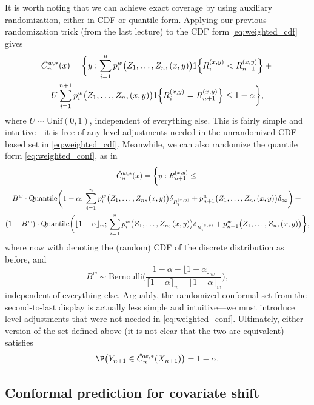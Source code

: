 \documentclass{article}
\begin{document}
It is worth noting that we can achieve exact coverage by using auxiliary
randomization, either in CDF or quantile form. Applying our previous
randomization trick (from the last lecture) to the CDF form
\eqref{eq:weighted_cdf} gives  
\begin{multline*}
\hat{C}_n^{w,*}(x) = \bigg\{ y : \sum_{i=1}^n p^w_i\big( Z_1,\dots,Z_n,(x,y)
\big) 1\Big\{ R_i^{(x,y)} < R^{(x,y)}_{n+1} \Big\} +{} \\ U \sum_{i=1}^{n+1} 
p^w_i\big( Z_1,\dots,Z_n,(x,y) \big) 1\Big\{ R_i^{(x,y)} = R^{(x,y)}_{n+1}
\Big\} \leq 1-\alpha \bigg\},
\end{multline*}
where $U \sim \mathrm{Unif}(0,1)$, independent of everything else. This is
fairly simple and intuitive---it is free of any level adjustments needed in the   
unrandomized CDF-based set in \eqref{eq:weighted_cdf}. Meanwhile, we can also 
randomize the quantile form \eqref{eq:weighted_conf}, as in  
\begin{multline*}
\hat{C}^{w,*}_n(x) = \bigg\{ y : R_{n+1}^{(x,y)} \leq {} \\
B^w \cdot \mathrm{Quantile}\bigg( 1-\alpha; \, \sum_{i=1}^n p^w_i\big(
Z_1,\dots,Z_n,(x,y) \big) \delta_{R_i^{(x,y)}} + p^w_{n+1}\big(
Z_1,\dots,Z_n,(x,y) \big) \delta_\infty \bigg) +{} \\ 
(1-B^w) \cdot \mathrm{Quantile}\bigg( \lfloor 1-\alpha \rfloor_w; \, 
\sum_{i=1}^n p^w_i\big( Z_1,\dots,Z_n,(x,y) \big) \delta_{R_i^{(x,y)}} +
p^w_{n+1}\big( Z_1,\dots,Z_n,(x,y) \big) \bigg\},     
\end{multline*}
where now  with 
denoting the (random) CDF of the discrete distribution  as before, and  
\[
B^w \sim \mathrm{Bernoulli}\bigg( \frac{1-\alpha - \lfloor 1-\alpha \rfloor_w}
{\lceil 1-\alpha \rceil_w - \lfloor 1-\alpha \rfloor_w} \bigg),
\]
independent of everything else. Arguably, the randomized conformal set from 
the second-to-last display is actually less simple and intuitive---we must
introduce level adjustments that were not needed in
\eqref{eq:weighted_conf}. Ultimately, either version of the set
 defined above (it is not clear that the two are 
equivalent) satisfies       
\[
\P\big( Y_{n+1} \in \hC^{w,*}_n(X_{n+1}) \big) = 1-\alpha.  
\]

\subsection{Conformal prediction for covariate shift}
\end{document}
